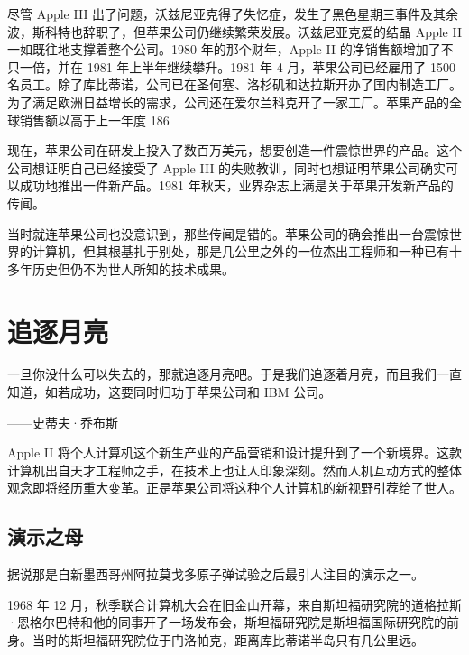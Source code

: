 \documentclass[12pt,UTF8]{ctexbook}
\begin{document}
尽管 Apple III 出了问题，沃兹尼亚克得了失忆症，发生了黑色星期三事件及其余波，斯科特也辞职了，但苹果公司仍继续繁荣发展。沃兹尼亚克爱的结晶 Apple II 一如既往地支撑着整个公司。1980 年的那个财年，Apple II 的净销售额增加了不只一倍，并在 1981 年上半年继续攀升。1981 年 4 月，苹果公司已经雇用了 1500 名员工。除了库比蒂诺，公司已在圣何塞、洛杉矶和达拉斯开办了国内制造工厂。为了满足欧洲日益增长的需求，公司还在爱尔兰科克开了一家工厂。苹果产品的全球销售额以高于上一年度 186%

现在，苹果公司在研发上投入了数百万美元，想要创造一件震惊世界的产品。这个公司想证明自己已经接受了 Apple III 的失败教训，同时也想证明苹果公司确实可以成功地推出一件新产品。1981 年秋天，业界杂志上满是关于苹果开发新产品的传闻。

当时就连苹果公司也没意识到，那些传闻是错的。苹果公司的确会推出一台震惊世界的计算机，但其根基扎于别处，那是几公里之外的一位杰出工程师和一种已有十多年历史但仍不为世人所知的技术成果。





\section{追逐月亮}


一旦你没什么可以失去的，那就追逐月亮吧。于是我们追逐着月亮，而且我们一直知道，如若成功，这要同时归功于苹果公司和 IBM 公司。

——史蒂夫·乔布斯



Apple II 将个人计算机这个新生产业的产品营销和设计提升到了一个新境界。这款计算机出自天才工程师之手，在技术上也让人印象深刻。然而人机互动方式的整体观念即将经历重大变革。正是苹果公司将这种个人计算机的新视野引荐给了世人。





\subsection{演示之母}


据说那是自新墨西哥州阿拉莫戈多原子弹试验之后最引人注目的演示之一。

1968 年 12 月，秋季联合计算机大会在旧金山开幕，来自斯坦福研究院的道格拉斯·恩格尔巴特和他的同事开了一场发布会，斯坦福研究院是斯坦福国际研究院的前身。当时的斯坦福研究院位于门洛帕克，距离库比蒂诺半岛只有几公里远。
\end{document}
